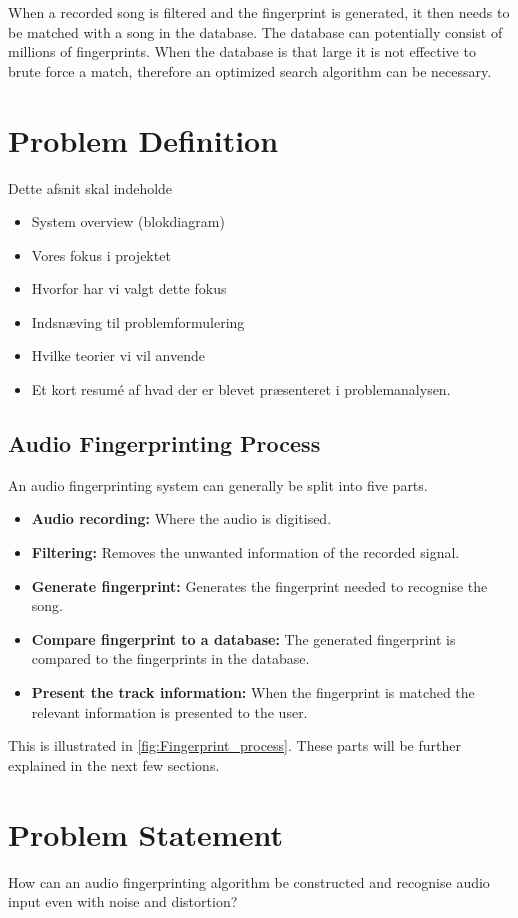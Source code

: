 When a recorded song is filtered and the fingerprint is generated, it then needs to be matched with a song in the database. The database can potentially consist of millions of fingerprints. When the database is that large it is not effective to brute force a match, therefore an optimized search algorithm can be necessary. \cite{haitsma2003highly}

\section{Problem Definition}
Dette afsnit skal indeholde
\begin{itemize}
    \item System overview (blokdiagram)
    \item Vores fokus i projektet
    \item Hvorfor har vi valgt dette fokus
    \item Indsnæving til problemformulering
    \item Hvilke teorier vi vil anvende
    \item Et kort resumé af hvad der er blevet præsenteret i problemanalysen. 
\end{itemize}
\subsection{Audio Fingerprinting Process}
An audio fingerprinting system can generally be split into five parts.
\begin{itemize}
    \item \textbf{Audio recording:} Where the audio is digitised.
    \item \textbf{Filtering:} Removes the unwanted information of the recorded signal.
    \item \textbf{Generate fingerprint:} Generates the fingerprint needed to recognise the song.
    \item \textbf{Compare fingerprint to a database:} The generated fingerprint is compared to the fingerprints in the database.
    \item \textbf{Present the track information:} When the fingerprint is matched the relevant information is presented to the user.
\end{itemize}
This is illustrated in \autoref{fig:Fingerprint_process}.
These parts will be further explained in the next few sections.
   


\section{Problem Statement}
How can an audio fingerprinting algorithm be constructed and recognise audio input even with noise and distortion? 

